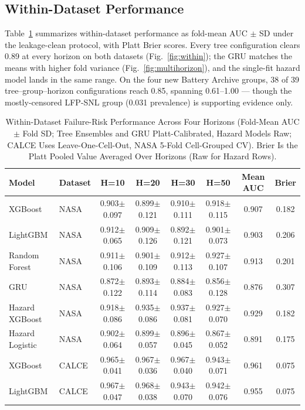 \documentclass[11pt,a4paper]{article}
\begin{document}
\subsection{Within-Dataset Performance}
Table~\ref{tab:within} summarizes within-dataset performance as fold-mean AUC $\pm$ SD under the leakage-clean protocol, with Platt Brier scores. Every tree configuration clears 0.89 at every horizon on both datasets (Fig.~\ref{fig:within}); the GRU matches the means with higher fold variance (Fig.~\ref{fig:multihorizon}), and the single-fit hazard model lands in the same range. On the four new Battery Archive groups, 38 of 39 tree--group--horizon configurations reach 0.85, spanning 0.61--1.00 --- though the mostly-censored LFP-SNL group (0.031 prevalence) is supporting evidence only.

\begin{table}[!t]
\caption{Within-Dataset Failure-Risk Performance Across Four Horizons (Fold-Mean AUC $\pm$ Fold SD; Tree Ensembles and GRU Platt-Calibrated, Hazard Models Raw; CALCE Uses Leave-One-Cell-Out, NASA 5-Fold Cell-Grouped CV). Brier Is the Platt Pooled Value Averaged Over Horizons (Raw for Hazard Rows).}
\label{tab:within}
\centering
\footnotesize
\begin{tabular}{llcccccc}
\toprule
\textbf{Model} & \textbf{Dataset} & \textbf{H=10} & \textbf{H=20} & \textbf{H=30} & \textbf{H=50} & \textbf{Mean AUC} & \textbf{Brier}\\
\midrule
XGBoost & NASA & 0.903$\pm$0.097 & 0.899$\pm$0.121 & 0.910$\pm$0.111 & 0.918$\pm$0.115 & 0.907 & 0.182 \\
LightGBM & NASA & 0.912$\pm$0.065 & 0.909$\pm$0.126 & 0.892$\pm$0.121 & 0.901$\pm$0.073 & 0.903 & 0.206 \\
Random Forest & NASA & 0.911$\pm$0.106 & 0.901$\pm$0.109 & 0.912$\pm$0.113 & 0.927$\pm$0.107 & 0.913 & 0.201 \\
GRU & NASA & 0.872$\pm$0.122 & 0.893$\pm$0.114 & 0.884$\pm$0.083 & 0.856$\pm$0.128 & 0.876 & 0.307 \\
Hazard XGBoost & NASA & 0.918$\pm$0.086 & 0.935$\pm$0.086 & 0.937$\pm$0.081 & 0.927$\pm$0.070 & 0.929 & 0.182 \\
Hazard Logistic & NASA & 0.902$\pm$0.064 & 0.899$\pm$0.057 & 0.896$\pm$0.045 & 0.867$\pm$0.052 & 0.891 & 0.175 \\
XGBoost & CALCE & 0.965$\pm$0.041 & 0.967$\pm$0.036 & 0.967$\pm$0.040 & 0.943$\pm$0.071 & 0.961 & 0.075 \\
LightGBM & CALCE & 0.967$\pm$0.047 & 0.968$\pm$0.038 & 0.943$\pm$0.070 & 0.942$\pm$0.076 & 0.955 & 0.075 \\

\end{tabular}
\end{table}
\end{document}
